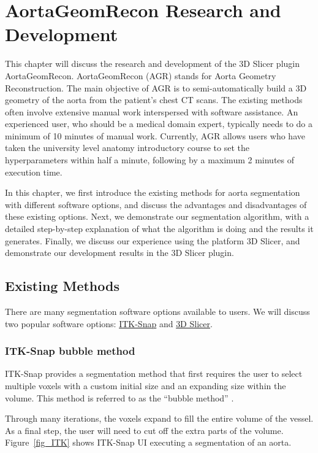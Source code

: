 \chapter{AortaGeomRecon Research and Development}

This chapter will discuss the research and development of the 3D Slicer plugin AortaGeomRecon. AortaGeomRecon (AGR) stands for Aorta Geometry Reconstruction. The main objective of AGR is to semi-automatically build a 3D geometry of the aorta from the patient's chest CT scans.  The existing methods often involve extensive manual work interspersed with software assistance. An experienced user, who should be a medical domain expert, typically needs to do a minimum of 10 minutes of manual work. Currently, AGR allows users who have taken the university level anatomy introductory course to set the hyperparameters within half a minute, following by a maximum 2 minutes of execution time.

In this chapter, we first introduce the existing methods for aorta segmentation with different software options, and discuss the advantages and disadvantages of these existing options. Next, we demonstrate our segmentation algorithm, with a detailed step-by-step explanation of what the algorithm is doing and the results it generates. Finally, we discuss our experience using the platform 3D Slicer, and demonstrate our development results in the 3D Slicer plugin.

\section{Existing Methods}
There are many segmentation software options available to users. We will discuss two popular software options: \href{https://www.itksnap.org/}{ITK-Snap} and \href{https://www.slicer.org/}{3D Slicer}.

\subsection{ITK-Snap bubble method} 
ITK-Snap provides a segmentation method that first requires the user to select multiple voxels with a custom initial size and an expanding size within the volume. This method is referred to as the ``bubble method'' \cite{gerig}.

Through many iterations, the voxels expand to fill the entire volume of the vessel. As a final step, the user will need to cut off the extra parts of the volume. Figure~\ref{fig_ITK} shows ITK-Snap UI executing a segmentation of an aorta.

